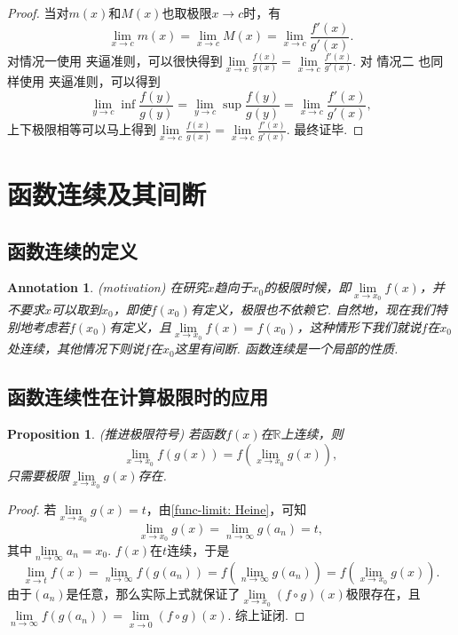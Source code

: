 \documentclass{article}
\newtheorem{proposition}[theorem]{Proposition}
\newtheorem{annotation}[theorem]{Annotation}
\begin{document}
\begin{proof}
当对$m(x)$和$M(x)$也取极限$x \rightarrow c$时，有
$$
\lim\limits_{x \rightarrow c} m(x) = \lim\limits_{x \rightarrow c} M(x) = \lim\limits_{x \rightarrow c} \frac{f'(x)}{g'(x)}.
$$
对{\color{blue}情况一}使用{\color{red} 夹逼准则}，可以很快得到$\lim\limits_{x \rightarrow c} \frac{f(x)}{g(x)} = \lim\limits_{x \rightarrow c} \frac{f'(x)}{g'(x)}$. 对{\color{blue} 情况二 }也同样使用{\color{red} 夹逼准则}，可以得到
$$
\lim\limits_{y \rightarrow c }\inf\frac{f(y)}{g(y)} = \lim\limits_{y \rightarrow c }\sup\frac{f(y)}{g(y)} = \lim\limits_{x \rightarrow c} \frac{f'(x)}{g'(x)},
$$
上下极限相等可以马上得到$\lim\limits_{x \rightarrow c} \frac{f(x)}{g(x)} = \lim\limits_{x \rightarrow c} \frac{f'(x)}{g'(x)}$. 最终证毕.
\end{proof}

\newpage
\section{函数连续及其间断}

\subsection{函数连续的定义}

\begin{annotation}
\rm {\color{red} (motivation)} 在研究$x$趋向于$x_0$的极限时候，即$\lim\limits_{x \rightarrow x_0} f(x)$，并不要求$x$可以取到$x_0$，即使$f(x_0)$有定义，极限也不依赖它. 自然地，现在我们特别地考虑若$f(x_0)$有定义，且$\lim\limits_{x \rightarrow x_0}f(x) = f(x_0)$，这种情形下我们就说$f$在$x_0$处{\color{red}连续}，其他情况下则说$f$在$x_0$这里有{\color{red}间断}. {\color{blue} 函数连续是一个局部的性质}.
\end{annotation}


\subsection{函数连续性在计算极限时的应用}

\begin{proposition}
\rm {\color{red} (推进极限符号)} 若函数$f(x)$在$\mathbb{R}$上连续，则
$$
\lim\limits_{x \rightarrow x_0} f(g(x)) = f(\lim\limits_{x \rightarrow x_0}g(x)),
$$
只需要极限$\lim\limits_{x \rightarrow x_0}g(x)$存在.
\end{proposition}

\begin{proof}
\rm 若$\lim\limits_{x \rightarrow x_0}g(x) = t$，由\ref{func-limit: Heine}，可知
$$
\lim\limits_{x \rightarrow x_0}g(x) = \lim\limits_{n \to \infty} g(a_n) = t,
$$
其中$\lim\limits_{n \to \infty}a_n = x_0$. $f(x)$在$t$连续，于是
$$
\lim\limits_{x \rightarrow t} f(x) = \lim\limits_{n \to \infty} f(g(a_n)) = f(\lim\limits_{n \to \infty}g(a_n)) = f(\lim\limits_{x \rightarrow x_0}g(x)).
$$
由于$(a_n)$是任意，那么实际上式就保证了$\lim\limits_{x \rightarrow x_0}(f \circ g) (x)$极限存在，且$\lim\limits_{n \to \infty} f(g(a_n)) = \lim\limits_{x \rightarrow 0}(f \circ g) (x)$. 综上证闭.	
\end{proof}
\end{document}
